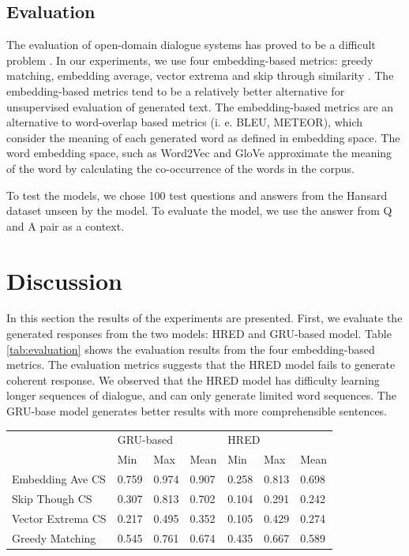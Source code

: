 \subsection{Evaluation}
The evaluation of open-domain dialogue systems has proved to be a difficult problem \cite{DBLP:journals/corr/GalleyBSJAQMGD15}. In our experiments, we use four embedding-based metrics: greedy matching, embedding average, vector extrema and skip through similarity  \cite{DBLP:journals/corr/LiuLSNCP16}. The embedding-based metrics tend to be a relatively better alternative for unsupervised evaluation of generated text. The embedding-based metrics are an alternative to word-overlap based metrics (i. e. BLEU, METEOR), which consider the meaning of each generated word as defined in embedding space. The word embedding space, such as Word2Vec \cite{DBLP:mikoloveW2V} and GloVe \cite{pennington2014glove} approximate the meaning of the word by calculating the co-occurrence of the words in the corpus. 

To test the models, we chose 100 test questions and answers from the Hansard dataset unseen by the model. To evaluate the model, we use the answer from Q and A pair as a context.

\section{Discussion}
In this section the results of the experiments are presented. First, we evaluate the generated responses from the two models: HRED and GRU-based model. Table \ref{tab:evaluation} shows the evaluation results from the four embedding-based metrics. The evaluation metrics suggests that the HRED model fails to generate coherent response. We observed that the HRED model has difficulty learning longer sequences of dialogue, and can only generate limited word sequences. The GRU-base model generates better results with more comprehensible sentences. 

\begin{table}
\begin{tabular*}{\textwidth}{llll|lll}

\toprule
& \multicolumn{3}{l}{GRU-based} & \multicolumn{3}{l}{HRED} \\
& Min   & Max   & Mean   & Min    & Max    & Mean   \\
\midrule
Embedding Ave CS  &   0.759    &   0.974   &    0.907    &   0.258     &  0.813      &     0.698   \\
Skip Though CS  &   0.307    &   0.813   &    0.702    &   0.104     &   0.291     &    0.242    \\
Vector Extrema CS   &   0.217    &   0.495   &    0.352    &    0.105    &    0.429    &    0.274    \\
Greedy Matching  &   0.545    &   0.761   &    0.674    &    0.435    &     0.667   &    0.589    \\
\bottomrule
\end{tabular*}
\end{table}



